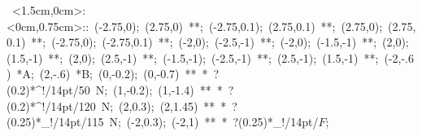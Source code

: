 
%

\hbox{
\xy    <1.5cm,0cm>:<0cm,0.75cm>::
       (-2.75,0); (2.75,0) **\dir{-};
       (-2.75,0.1); (2.75,0.1) **\dir{-};
       (2.75,0); (2.75,0.1) **\dir{-};
       (-2.75,0); (-2.75,0.1) **\dir{-};
	(-2,0); (-2.5,-1) **\dir{-};
	(-2,0); (-1.5,-1) **\dir{-};
	(2,0); (1.5,-1) **\dir{-};
	(2,0); (2.5,-1) **\dir{-};
	(-1.5,-1); (-2.5,-1) **\dir{-};
	(2.5,-1); (1.5,-1) **\dir{-};
 	(-2,-.6) *{A};
 	(2,-.6) *{B};
	(0,-0.2); (0,-0.7) **\dir{-} *\dir{>} ?(0.2)*^!/14pt/\hbox{50 N};
	(1,-0.2); (1,-1.4) **\dir{-} *\dir{>} ?(0.2)*^!/14pt/\hbox{120 N};
	(2,0.3); (2,1.45) **\dir{-} *\dir{>}  ?(0.25)*_!/14pt/\hbox{115 N};
	(-2,0.3); (-2,1) **\dir{-} *\dir{>}  ?(0.25)*_!/14pt/\hbox{$F$};
\endxy}

